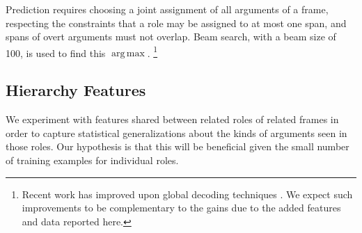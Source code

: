 \documentclass[11pt,a4paper]{article}
\DeclareMathOperator*{\argmax}{arg\,max}
\newcommand{\ensuretext}[1]{#1}
\newcommand{\nssmarker}{\ensuretext{\textcolor{magenta}{\ensuremath{^{\textsc{NS}}_{\textsc{S}}}}}}
\newcommand{\mkmarker}{\ensuretext{\textcolor{red}{\ensuremath{^{\textsc{M}}_{\textsc{K}}}}}}
\newcommand{\arkcomment}[3]{\ensuretext{\textcolor{#3}{[#1 #2]}}}
\newcommand{\nss}[1]{\arkcomment{\nssmarker}{#1}{magenta}}
\newcommand{\mk}[1]{\arkcomment{\mkmarker}{#1}{red}}
\newcommand{\fnf}[1]{\textsc{\textsf{#1}}} %
\newcommand{\fnr}[1]{\textbf{\textsf{#1}}} %
\begin{document}
Prediction requires choosing a joint assignment of all arguments of a
frame,
respecting the constraints that a role may be assigned to at most one span, and
spans of overt arguments must not overlap.
Beam search, with a beam size of 100, is used to find this $\argmax$.%
\footnote{Recent work has improved upon global decoding techniques
\citep{das-martins-12,tackstrom-15}.
We expect such improvements to be complementary to the gains due to the added features and data reported here.}


\subsection{Hierarchy Features}\label{sec:hierfeats}

We experiment with features shared between related roles of related frames 
in order to capture statistical generalizations about the kinds of arguments 
seen in those roles. 
Our hypothesis is that this will be beneficial given the small number of training examples 
for individual roles.


\end{document}
